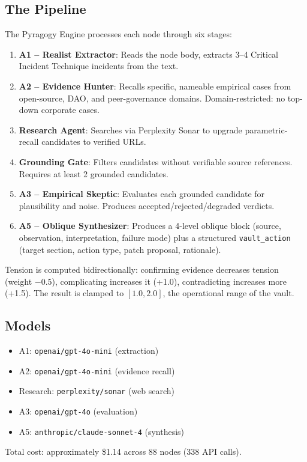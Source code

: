 \documentclass[11pt,a4paper]{article}
\begin{document}
\subsection{The Pipeline}
The Pyragogy Engine processes each node through six stages:
\begin{enumerate}
  \item \textbf{A1 -- Realist Extractor}: Reads the node body, extracts 3--4 Critical Incident Technique incidents from the text.
  \item \textbf{A2 -- Evidence Hunter}: Recalls specific, nameable empirical cases from open-source, DAO, and peer-governance domains. Domain-restricted: no top-down corporate cases.
  \item \textbf{Research Agent}: Searches via Perplexity Sonar to upgrade parametric-recall candidates to verified URLs.
  \item \textbf{Grounding Gate}: Filters candidates without verifiable source references. Requires at least 2 grounded candidates.
  \item \textbf{A3 -- Empirical Skeptic}: Evaluates each grounded candidate for plausibility and noise. Produces accepted/rejected/degraded verdicts.
  \item \textbf{A5 -- Oblique Synthesizer}: Produces a 4-level oblique block (source, observation, interpretation, failure mode) plus a structured \texttt{vault\_action} (target section, action type, patch proposal, rationale).
\end{enumerate}
Tension is computed bidirectionally: confirming evidence decreases tension (weight $-0.5$), complicating increases it (+1.0), contradicting increases more (+1.5). The result is clamped to $[1.0, 2.0]$, the operational range of the vault.

\subsection{Models}
\begin{itemize}
  \item A1: \texttt{openai/gpt-4o-mini} (extraction)
  \item A2: \texttt{openai/gpt-4o-mini} (evidence recall)
  \item Research: \texttt{perplexity/sonar} (web search)
  \item A3: \texttt{openai/gpt-4o} (evaluation)
  \item A5: \texttt{anthropic/claude-sonnet-4} (synthesis)
\end{itemize}
Total cost: approximately \$1.14 across 88 nodes (338 API calls).
\end{document}
